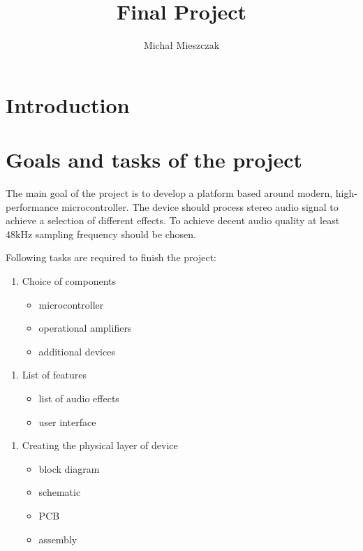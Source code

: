 \documentclass{article}
\author{Michał Mieszczak}
\title{Final Project}
\begin{document}
\maketitle

\newpage



\tableofcontents

\newpage



\section{Introduction}

\newpage



\section{Goals and tasks of the project}
The main goal of the project is to develop a platform based around modern, high-performance microcontroller.
The device should process stereo audio signal to achieve a selection of different effects.
To achieve decent audio quality at least 48kHz sampling frequency should be chosen.

Following tasks are required to finish the project:

\begin{enumerate}
    \item Choice of components
    \begin{itemize}
        \item microcontroller
        \item operational amplifiers
        \item additional devices
    \end{itemize}
\end{enumerate}

\begin{enumerate}
    \item List of features
    \begin{itemize}
        \item list of audio effects
        \item user interface
    \end{itemize}
\end{enumerate}

\begin{enumerate}
    \item Creating the physical layer of device
    \begin{itemize}
        \item block diagram
        \item schematic
        \item PCB
        \item assembly 
    \end{itemize}
\end{enumerate}
\end{document}
